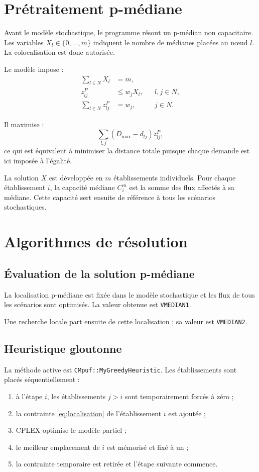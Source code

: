\documentclass[11pt,a4paper]{article}
\newcommand{\code}[1]{\texttt{#1}}
\begin{document}
\section{Prétraitement p-médiane}

Avant le modèle stochastique, le programme résout un p-médian non capacitaire.
Les variables $X_l\in\{0,\dots,m\}$ indiquent le nombre de médianes placées
au nœud $l$. La colocalisation est donc autorisée.

Le modèle impose :
\begin{align}
\sum_{l\in N}X_l &= m,\\
z^{P}_{lj} &\leq w_jX_l,
  &&l,j\in N,\\
\sum_{l\in N}z^{P}_{lj} &= w_j,
  &&j\in N.
\end{align}

Il maximise :
\[
\sum_{l,j}(D_{\max}-d_{lj})z^{P}_{lj},
\]
ce qui est équivalent à minimiser la distance totale puisque chaque demande
est ici imposée à l'égalité.

La solution $X$ est développée en $m$ établissements individuels. Pour
chaque établissement $i$, la capacité médiane $C^m_i$ est la somme des flux
affectés à sa médiane. Cette capacité sert ensuite de référence à tous les
scénarios stochastiques.

\section{Algorithmes de résolution}

\subsection{Évaluation de la solution p-médiane}

La localisation p-médiane est fixée dans le modèle stochastique et les flux
de tous les scénarios sont optimisés. La valeur obtenue est
\code{VMEDIAN1}.

Une recherche locale part ensuite de cette localisation ; sa valeur est
\code{VMEDIAN2}.

\subsection{Heuristique gloutonne}

La méthode active est \code{CMpuf::MyGreedyHeuristic}. Les établissements
sont placés séquentiellement :
\begin{enumerate}
  \item à l'étape $i$, les établissements $j>i$ sont temporairement forcés à
        zéro ;
  \item la contrainte \eqref{eq:localisation} de l'établissement $i$ est
        ajoutée ;
  \item CPLEX optimise le modèle partiel ;
  \item le meilleur emplacement de $i$ est mémorisé et fixé à un ;
  \item la contrainte temporaire est retirée et l'étape suivante commence.
\end{enumerate}
\end{document}
